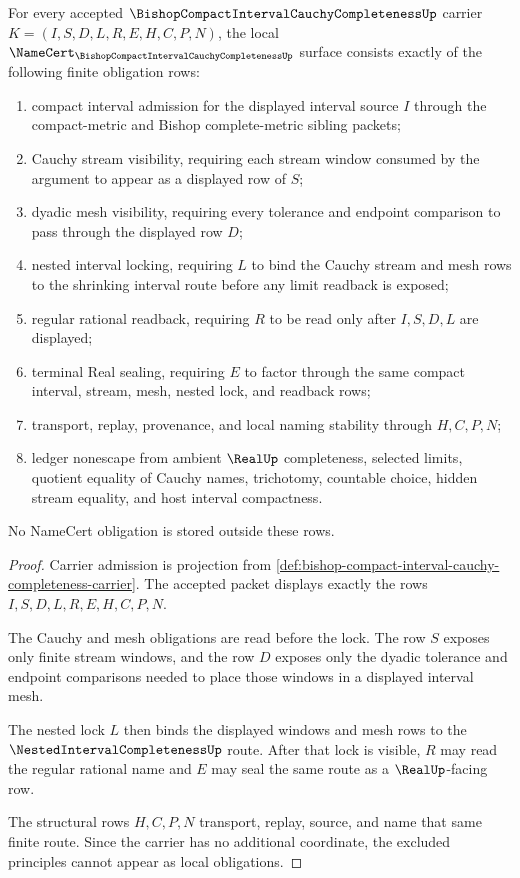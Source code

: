 \begin{theorem}
\label{thm:bishop-compact-interval-cauchy-completeness-obligations}
For every accepted $\BishopCompactIntervalCauchyCompletenessUp$ carrier $K=(I,S,D,L,R,E,H,C,P,N)$, the local $\NameCert_{\BishopCompactIntervalCauchyCompletenessUp}$ surface consists exactly of the following finite obligation rows:
\begin{enumerate}
\item compact interval admission for the displayed interval source $I$ through the compact-metric and Bishop complete-metric sibling packets;
\item Cauchy stream visibility, requiring each stream window consumed by the argument to appear as a displayed row of $S$;
\item dyadic mesh visibility, requiring every tolerance and endpoint comparison to pass through the displayed row $D$;
\item nested interval locking, requiring $L$ to bind the Cauchy stream and mesh rows to the shrinking interval route before any limit readback is exposed;
\item regular rational readback, requiring $R$ to be read only after $I,S,D,L$ are displayed;
\item terminal Real sealing, requiring $E$ to factor through the same compact interval, stream, mesh, nested lock, and readback rows;
\item transport, replay, provenance, and local naming stability through $H,C,P,N$;
\item ledger nonescape from ambient $\RealUp$ completeness, selected limits, quotient equality of Cauchy names, trichotomy, countable choice, hidden stream equality, and host interval compactness.
\end{enumerate}
No NameCert obligation is stored outside these rows.
\end{theorem}
\begin{proof}
Carrier admission is projection from \autoref{def:bishop-compact-interval-cauchy-completeness-carrier}. The accepted packet displays exactly the rows $I,S,D,L,R,E,H,C,P,N$.

The Cauchy and mesh obligations are read before the lock. The row $S$ exposes only finite stream windows, and the row $D$ exposes only the dyadic tolerance and endpoint comparisons needed to place those windows in a displayed interval mesh.

The nested lock $L$ then binds the displayed windows and mesh rows to the $\NestedIntervalCompletenessUp$ route. After that lock is visible, $R$ may read the regular rational name and $E$ may seal the same route as a $\RealUp$-facing row.

The structural rows $H,C,P,N$ transport, replay, source, and name that same finite route. Since the carrier has no additional coordinate, the excluded principles cannot appear as local obligations.
\end{proof}

